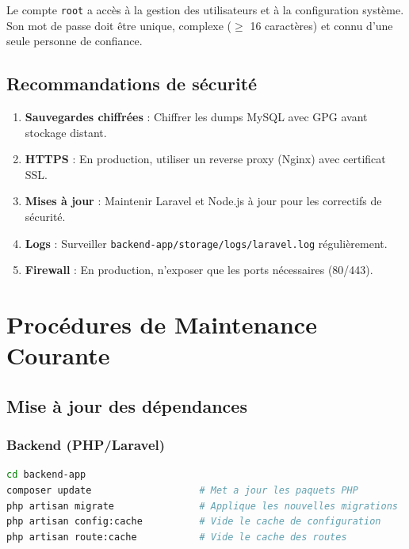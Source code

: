 \documentclass[12pt,a4paper]{report}
\begin{document}
\begin{dangerbox}
Le compte \texttt{root} a accès à la gestion des utilisateurs et à la configuration système. Son mot de passe doit être unique, complexe ($\geq$ 16 caractères) et connu d'une seule personne de confiance.
\end{dangerbox}

\section{Recommandations de sécurité}

\begin{enumerate}[leftmargin=*]
  \item \textbf{Sauvegardes chiffrées} : Chiffrer les dumps MySQL avec GPG avant stockage distant.
  \item \textbf{HTTPS} : En production, utiliser un reverse proxy (Nginx) avec certificat SSL.
  \item \textbf{Mises à jour} : Maintenir Laravel et Node.js à jour pour les correctifs de sécurité.
  \item \textbf{Logs} : Surveiller \texttt{backend-app/storage/logs/laravel.log} régulièrement.
  \item \textbf{Firewall} : En production, n'exposer que les ports nécessaires (80/443).
\end{enumerate}

\chapter{Procédures de Maintenance Courante}

\section{Mise à jour des dépendances}

\subsection{Backend (PHP/Laravel)}
\begin{lstlisting}[language=bash]
cd backend-app
composer update                   # Met a jour les paquets PHP
php artisan migrate               # Applique les nouvelles migrations
php artisan config:cache          # Vide le cache de configuration
php artisan route:cache           # Vide le cache des routes
\end{lstlisting}
\end{document}
